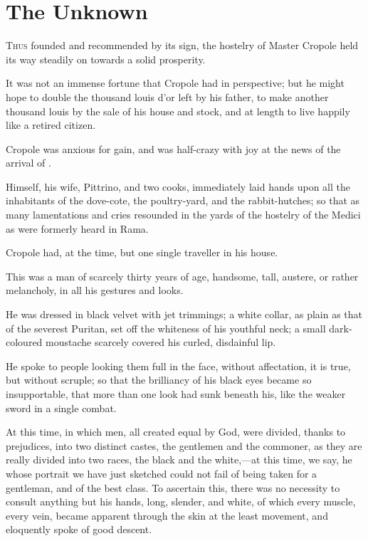 \chapter{The Unknown}

\lettrine{T}{hus} founded and recommended by its sign, the hostelry of Master Cropole held its way steadily on towards a solid prosperity.

\zz
It was not an immense fortune that Cropole had in perspective; but he might hope to double the thousand louis d'or left by his father, to make another thousand louis by the sale of his house and stock, and at length to live happily like a retired citizen.

Cropole was anxious for gain, and was half-crazy with joy at the news of the arrival of .

Himself, his wife, Pittrino, and two cooks, immediately laid hands upon all the inhabitants of the dove-cote, the poultry-yard, and the rabbit-hutches; so that as many lamentations and cries resounded in the yards of the hostelry of the Medici as were formerly heard in Rama.

Cropole had, at the time, but one single traveller in his house.

This was a man of scarcely thirty years of age, handsome, tall, austere, or rather melancholy, in all his gestures and looks.

He was dressed in black velvet with jet trimmings; a white collar, as plain as that of the severest Puritan, set off the whiteness of his youthful neck; a small dark-coloured moustache scarcely covered his curled, disdainful lip.

He spoke to people looking them full in the face, without affectation, it is true, but without scruple; so that the brilliancy of his black eyes became so insupportable, that more than one look had sunk beneath his, like the weaker sword in a single combat.

At this time, in which men, all created equal by God, were divided, thanks to prejudices, into two distinct castes, the gentlemen and the commoner, as they are really divided into two races, the black and the white,—at this time, we say, he whose portrait we have just sketched could not fail of being taken for a gentleman, and of the best class. To ascertain this, there was no necessity to consult anything but his hands, long, slender, and white, of which every muscle, every vein, became apparent through the skin at the least movement, and eloquently spoke of good descent.

